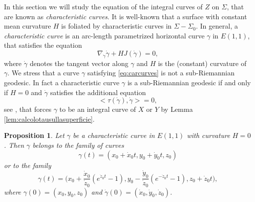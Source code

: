 \documentclass[10pt]{amsart}
\newtheorem{proposition}[theorem]{Proposition}
\theoremstyle{definition}
\theoremstyle{remark}
\numberwithin{equation}{section}
\begin{document}
In this section we will study the equation of the integral curves of $Z$ on ${\Sigma}$, that are known as \emph{characteristic curves}. It is well-known that a surface with constant mean curvature $H$ is foliated by characteristic curves in ${\Sigma}-{\Sigma}_0$. In general, a \emph{characteristic curve} is an arc-length parametrized horizontal curve ${\gamma}$ in ${E(1,1)}$, that satisfies the equation 
\begin{equation}\label{eq:carcurves}
{\nabla}_{\dot{\gamma}} \dot{\gamma}+HJ(\dot{\gamma})=0,
\end{equation}
where $\dot{\gamma}$ denotes the tangent vector along ${\gamma}$ and $H$ is the (constant) curvature of ${\gamma}$. 
We stress that a curve ${\gamma}$ satisfying  \eqref{eq:carcurves} is not a sub-Riemannian geodesic. In fact a characteristic curve ${\gamma}$ is a sub-Riemannian geodesic if and only if $H=0$ and $\dot{\gamma}$ satisfies the additional equation
\begin{equation}
       {\big<{\tau(\dot{\gamma}),\dot{\gamma}}\big>}=0,
\end{equation}
see \cite[Proposition~15]{Ru}, that forces ${\gamma}$ to be an integral curve of $X$ or $Y$ by Lemma \ref{lem:calcolotausullasuperficie}.

\begin{proposition}\label{lemma:carcurves} Let ${\gamma}$ be a characteristic curve in ${E(1,1)}$ with curvature $H=0$. Then ${\gamma}$ belongs to the family of curves
\begin{equation}
{\gamma}(t)=(x_0+\dot{x}_0 t, y_0+\dot{y}_0 t, z_0)
\end{equation}
or to the family
\begin{equation}
{\gamma}(t)=\bigg(x_0+\frac{\dot{x}_0}{\dot{z}_0}(e^{\dot{z}_0t}-1), y_0-\frac{\dot{y}_0}{\dot{z}_0}(e^{-\dot{z}_0t}-1),
z_0+\dot{z}_0t\bigg),
\end{equation}
where ${\gamma}(0)=(x_0,y_0,z_0)$ and $\dot{\gamma}(0)=(\dot{x}_0,\dot{y}_0,\dot{z}_0)$.
\end{proposition}
\end{document}
